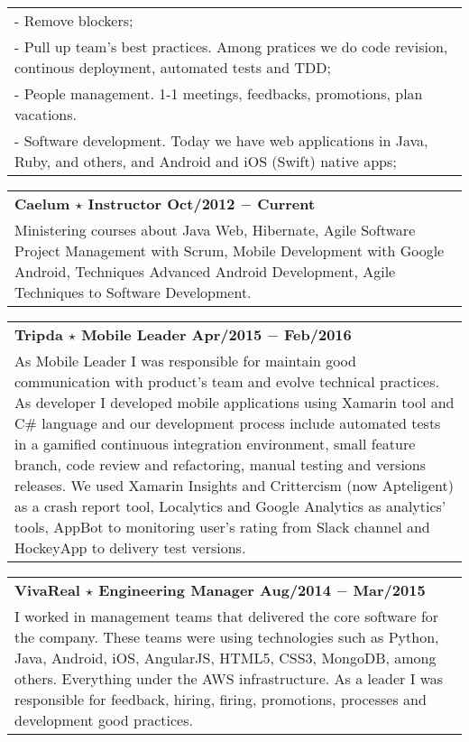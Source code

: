 \documentclass[a4paper, oneside, final]{scrartcl}
\newcommand{\vspc}{\vspace{0.15cm}} %
\begin{document}
\begin{center}
\begin{tabularx}{1\linewidth}{X}
- Remove blockers;  \\
- Pull up team's best practices. Among pratices we do code revision, continous deployment, automated tests and TDD; \\
- People management. 1-1 meetings, feedbacks, promotions, plan vacations. \\
- Software development. Today we have web applications in Java, Ruby, and others, and Android and iOS (Swift) native apps; \vspc\\ 
\end{tabularx}

\begin{tabularx}{1\linewidth}{X}
{\bf Caelum $\star$ Instructor \hfill Oct/2012 $-$ Current} \\
Ministering courses about Java Web, Hibernate, Agile Software Project Management with Scrum, Mobile Development with Google Android, Techniques Advanced Android Development, Agile Techniques to Software Development. \vspc\\
\end{tabularx}

\begin{tabularx}{1\linewidth}{X}
{\bf Tripda $\star$ Mobile Leader \hfill Apr/2015 $-$ Feb/2016} \\
As Mobile Leader I was responsible for maintain good communication with product's team and evolve technical practices. As developer I developed mobile applications using Xamarin tool and C\# language and our development process include automated tests in a gamified continuous integration environment, small feature branch, code review and refactoring, manual testing and versions releases. We used Xamarin Insights and Crittercism (now Apteligent) as a crash report tool, Localytics and Google Analytics as analytics' tools, AppBot to monitoring user's rating from Slack channel and HockeyApp to delivery test versions. \vspc\\
\end{tabularx}

\begin{tabularx}{1\linewidth}{X}
{\bf VivaReal $\star$ Engineering Manager \hfill Aug/2014 $-$ Mar/2015} \\
I worked in management teams that delivered the core software for the company. These teams were using technologies such as Python, Java, Android, iOS, AngularJS, HTML5, CSS3, MongoDB, among others. Everything under the AWS infrastructure. As a leader I was responsible for feedback, hiring, firing, promotions, processes and development good practices. \vspc\\
\end{tabularx}


\end{center}
\end{document}
